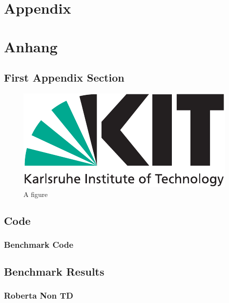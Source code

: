 
{\chapter{Appendix}}    %
{\chapter{Anhang}}      %
\label{chap:appendix}


\section{First Appendix Section}
\label{sec:appendix:FirstSection}
		
\setcounter{figure}{0}
		
\begin{figure} [ht]
  \centering
  \includegraphics[width=.5\linewidth]{logos/kitlogo_en_cmyk}
  \caption{A figure}
  \label{fig:anotherfigure}
\end{figure}

\section{Code}

\subsection{Benchmark Code}

\section{Benchmark Results}
\subsection{Roberta Non TD}
\label{sec:appendix:benchmarks:roberta}

